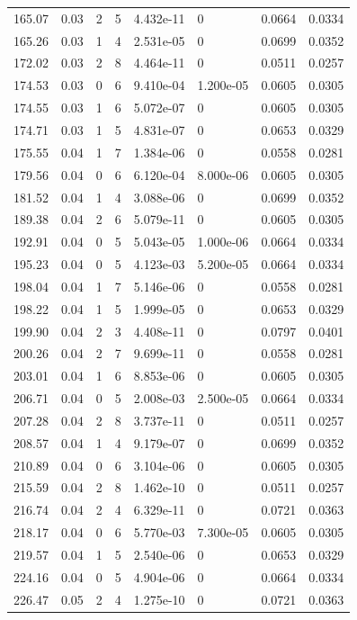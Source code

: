 \documentclass[preview]{standalone}
\begin{document}
{{{\begin{tabular}{L{1.2cm}C{1.2cm} C{0.3cm}C{0.5cm} C{1.4cm}C{1.4cm} C{1.4cm}C{1.4cm}}
  165.07  &  0.03  & 2     &  5 &  4.432e-11  & 0  & 0.0664 &  0.0334   \\ 
  165.26  &  0.03  & 1     &  4 &  2.531e-05  & 0  & 0.0699 &  0.0352   \\ 
  172.02  &  0.03  & 2     &  8 &  4.464e-11  & 0  & 0.0511 &  0.0257   \\ 
  174.53  &  0.03  & 0     &  6 &  9.410e-04  & 1.200e-05  & 0.0605 &  0.0305   \\ 
  174.55  &  0.03  & 1     &  6 &  5.072e-07  & 0  & 0.0605 &  0.0305   \\ 
  174.71  &  0.03  & 1     &  5 &  4.831e-07  & 0  & 0.0653 &  0.0329   \\ 
  175.55  &  0.04  & 1     &  7 &  1.384e-06  & 0  & 0.0558 &  0.0281   \\ 
  179.56  &  0.04  & 0     &  6 &  6.120e-04  & 8.000e-06  & 0.0605 &  0.0305   \\ 
  181.52  &  0.04  & 1     &  4 &  3.088e-06  & 0  & 0.0699 &  0.0352   \\ 
  189.38  &  0.04  & 2     &  6 &  5.079e-11  & 0  & 0.0605 &  0.0305   \\ 
  192.91  &  0.04  & 0     &  5 &  5.043e-05  & 1.000e-06  & 0.0664 &  0.0334   \\ 
  195.23  &  0.04  & 0     &  5 &  4.123e-03  & 5.200e-05  & 0.0664 &  0.0334   \\ 
  198.04  &  0.04  & 1     &  7 &  5.146e-06  & 0  & 0.0558 &  0.0281   \\ 
  198.22  &  0.04  & 1     &  5 &  1.999e-05  & 0  & 0.0653 &  0.0329   \\ 
  199.90  &  0.04  & 2     &  3 &  4.408e-11  & 0  & 0.0797 &  0.0401   \\ 
  200.26  &  0.04  & 2     &  7 &  9.699e-11  & 0  & 0.0558 &  0.0281   \\ 
  203.01  &  0.04  & 1     &  6 &  8.853e-06  & 0  & 0.0605 &  0.0305   \\ 
  206.71  &  0.04  & 0     &  5 &  2.008e-03  & 2.500e-05  & 0.0664 &  0.0334   \\ 
  207.28  &  0.04  & 2     &  8 &  3.737e-11  & 0  & 0.0511 &  0.0257   \\ 
  208.57  &  0.04  & 1     &  4 &  9.179e-07  & 0  & 0.0699 &  0.0352   \\ 
  210.89  &  0.04  & 0     &  6 &  3.104e-06  & 0  & 0.0605 &  0.0305   \\ 
  215.59  &  0.04  & 2     &  8 &  1.462e-10  & 0  & 0.0511 &  0.0257   \\ 
  216.74  &  0.04  & 2     &  4 &  6.329e-11  & 0  & 0.0721 &  0.0363   \\ 
  218.17  &  0.04  & 0     &  6 &  5.770e-03  & 7.300e-05  & 0.0605 &  0.0305   \\ 
  219.57  &  0.04  & 1     &  5 &  2.540e-06  & 0  & 0.0653 &  0.0329   \\ 
  224.16  &  0.04  & 0     &  5 &  4.904e-06  & 0  & 0.0664 &  0.0334   \\ 
  226.47  &  0.05  & 2     &  4 &  1.275e-10  & 0  & 0.0721 &  0.0363   \\ 
\hline 
\end{tabular} 

}}}
\end{document}
